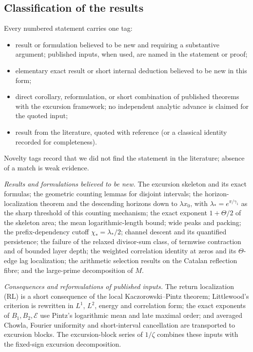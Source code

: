 \documentclass[11pt,reqno]{amsart}
\numberwithin{equation}{section}
\theoremstyle{plain}
\theoremstyle{definition}
\theoremstyle{remark}
\newcommand{\En}{\mathcal{E}}
\begin{document}
\subsection{Classification of the results}
\label{subsec:classification}
Every numbered statement carries one tag:
\begin{itemize}[leftmargin=2.5em]
\item[\textup{[N]}] result or formulation believed to be new and requiring a
substantive argument; published inputs, when used, are named in the statement
or proof;
\item[\textup{[N-el]}] elementary exact result or short internal deduction
believed to be new in this form;
\item[\textup{[C]}] direct corollary, reformulation, or short combination of
published theorems with the excursion framework; no independent analytic
advance is claimed for the quoted input;
\item[\textup{[L]}] result from the literature, quoted with reference (or a
classical identity recorded for completeness).
\end{itemize}
Novelty tags record that we did not find the statement in the literature;
absence of a match is weak evidence.

\smallskip\noindent\emph{Results and formulations believed to be new.}
The excursion skeleton and its exact formulas; the geometric counting lemmas
for disjoint intervals; the horizon-localization theorem and the descending
horizons down to $\lambda x_0$, with
$\lambda_*=e^{\pi/\gamma_1}$ as the sharp threshold of this counting
mechanism; the exact exponent $1+\Theta/2$ of the skeleton area; the mean
logarithmic-length bound; wide peaks and packing; the prefix-dependency cutoff
$\chi_*=\lambda_*/2$; channel descent and its quantified persistence; the
failure of the relaxed divisor-sum class, of termwise contraction and of
bounded layer depth; the weighted correlation identity at zeros and its
$\Theta$-edge lag localization; the arithmetic selection results on the
Catalan reflection fibre; and the large-prime decomposition of $M$.

\smallskip\noindent\emph{Consequences and reformulations of published inputs.}
The return localization (RL) is a short consequence of the local
Kaczorowski--Pintz theorem; Littlewood's criterion is rewritten in $L^1$,
$L^2$, energy and correlation form; the exact exponents of $B_1,B_2,\En$
use Pintz's logarithmic mean and late maximal order; and averaged Chowla,
Fourier uniformity and short-interval cancellation are transported to
excursion blocks.  The excursion-block series of $1/\zeta$ combines these
inputs with the fixed-sign excursion decomposition.
\end{document}
